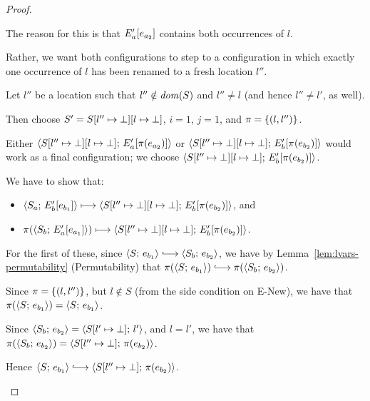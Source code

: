 \begin{proof}
\begin{enumerate}
\begin{enumerate}
\begin{itemize}
        The reason for this is that $E'_a\hspace{-0.5mm}\left[e_{a_2}\right]$
        contains both occurrences of $l$.

        Rather, we want both configurations to step to a configuration
        in which exactly one occurrence of $l$ has been renamed to a
        fresh location $l''$.

        Let $l''$ be a location such that $l'' \notin \mathit{dom}(S)$ and
        $l'' \neq l$ (and hence $l'' \neq l'$, as well).

        Then choose $S' = S[l'' \mapsto \bot][l \mapsto \bot]$,
        $i = 1$, $j = 1$, and $\pi = \left\{(l, l'')\right\}$.

        Either
        $\langle S[l'' \mapsto \bot][l \mapsto \bot];\, E'_a\hspace{-0.5mm}\left[\pi(e_{a_2})\right] \rangle$
        or
        $\langle S[l'' \mapsto \bot][l \mapsto \bot];\, E'_b\hspace{-0.5mm}\left[\pi(e_{b_2})\right] \rangle$
        would work as a final configuration; we choose
        $\langle S[l'' \mapsto \bot][l \mapsto \bot];\, E'_b\hspace{-0.5mm}\left[\pi(e_{b_2})\right] \rangle$.

        We have to show that:
        \begin{itemize}
        \item $\langle S_a;\, E'_b\hspace{-0.5mm}\left[e_{b_1}\right] \rangle \longmapsto
          \langle S[l'' \mapsto \bot][l \mapsto \bot];\, E'_b\hspace{-0.5mm}\left[\pi(e_{b_2})\right] \rangle$,
          and
        \item $\pi(\langle S_b;\, E'_a\hspace{-0.5mm}\left[e_{a_1}\right] \rangle) \longmapsto
          \langle S[l'' \mapsto \bot][l \mapsto \bot];\, E'_b\hspace{-0.5mm}\left[\pi(e_{b_2})\right] \rangle$.
        \end{itemize}

        For the first of these, since $\config{S}{e_{b_1}}
        \parstepsto \config{S_b}{e_{b_2}}$, we have by
        Lemma~\ref{lem:lvars-permutability} (Permutability) that
        $\pi(\config{S}{e_{b_1}}) \parstepsto
        \pi(\config{S_b}{e_{b_2}})$.

        Since $\pi = \left\{(l, l'')\right\}$, but $l \notin S$ (from the
        side condition on {\sc E-New}), we have that
        $\pi(\langle S;\, e_{b_1} \rangle) = \langle S;\, e_{b_1} \rangle$.

        Since $\langle S_b;\, e_{b_2} \rangle =
        \langle S[l' \mapsto \bot];\, l' \rangle$, and $l = l'$, we have
        that $\pi(\langle S_b;\, e_{b_2} \rangle) =
        \langle S[l'' \mapsto \bot];\, \pi(e_{b_2}) \rangle$.

        Hence $\config{S}{e_{b_1}} \parstepsto
        \config{\extSRaw{S}{l''}{\bot}}{\pi(e_{b_2})}$.


\end{itemize}
\end{enumerate}
\end{enumerate}
\end{proof}
